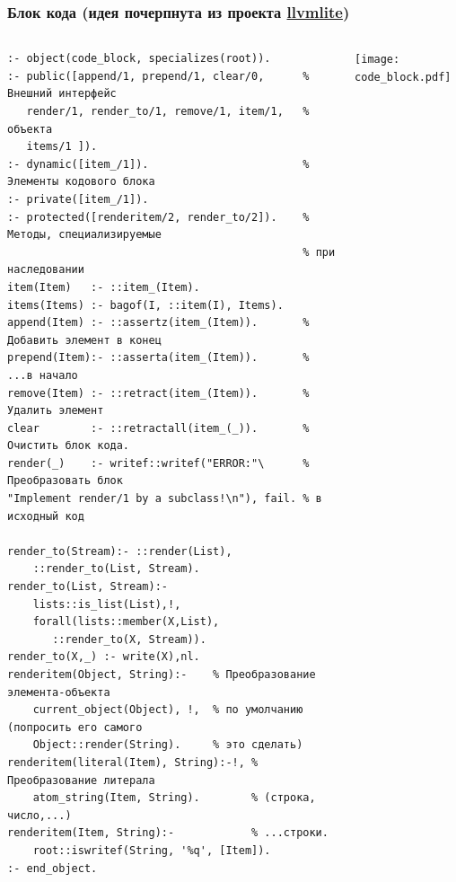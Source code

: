 \documentclass[10pt]{beamer}
\begin{document}
\begin{frame}[fragile]
  \frametitle{Блок кода (идея почерпнута из проекта \href{https://github.com/numba/llvmlite}{llvmlite})}
  \begin{columns}
    \begin{column}{0.6\textwidth}
      \flushleft
\begin{verbatim}
:- object(code_block, specializes(root)).
:- public([append/1, prepend/1, clear/0,      % Внешний интерфейс
   render/1, render_to/1, remove/1, item/1,   % объекта
   items/1 ]).
:- dynamic([item_/1]).                        % Элементы кодового блока
:- private([item_/1]).
:- protected([renderitem/2, render_to/2]).    % Методы, специализируемые
                                              % при наследовании
item(Item)   :- ::item_(Item).
items(Items) :- bagof(I, ::item(I), Items).
append(Item) :- ::assertz(item_(Item)).       % Добавить элемент в конец
prepend(Item):- ::asserta(item_(Item)).       % ...в начало
remove(Item) :- ::retract(item_(Item)).       % Удалить элемент
clear        :- ::retractall(item_(_)).       % Очистить блок кода.
render(_)    :- writef::writef("ERROR:"\      % Преобразовать блок
"Implement render/1 by a subclass!\n"), fail. % в исходный код

render_to(Stream):- ::render(List),
    ::render_to(List, Stream).
render_to(List, Stream):-
    lists::is_list(List),!,
    forall(lists::member(X,List),
       ::render_to(X, Stream)).
render_to(X,_) :- write(X),nl.
renderitem(Object, String):-    % Преобразование элемента-объекта
    current_object(Object), !,  % по умолчанию (попросить его самого
    Object::render(String).     % это сделать)
renderitem(literal(Item), String):-!, % Преобразование литерала
    atom_string(Item, String).        % (строка, число,...)
renderitem(Item, String):-            % ...строки.
    root::iswritef(String, '%q', [Item]).
:- end_object.
\end{verbatim}
    \end{column}
    \begin{column}{0.4\textwidth}
      \texttt{[image: code\_block.pdf]}
    \end{column}
  \end{columns}
\end{frame}
\end{document}
